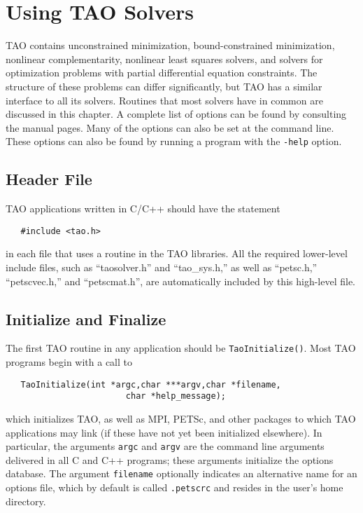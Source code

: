 %
%

\chapter{Using TAO Solvers}
\label{chapter:tao_solver}

TAO contains unconstrained minimization, bound-constrained minimization, 
nonlinear complementarity, nonlinear least squares solvers, and solvers
for optimization problems with partial differential equation constraints.
The structure of these problems can differ significantly, but TAO has a 
similar interface to all its solvers.  
Routines that most solvers have in common are discussed in 
this chapter.
A complete list of options can be found by consulting the manual pages.
Many of the options can also be set at the command line.  These options
can also be found by
running a program with the {\tt -help} option.

\section{Header File}

TAO applications written in C/C++ should have the statement 
\begin{verbatim}
   #include <tao.h>
\end{verbatim}
\noindent
in each file that uses a routine in the TAO libraries.
All the required lower-level include files, such as ``taosolver.h''
and ``tao\_sys.h,'' as well as ``petsc.h,'' ``petscvec.h,'' and
``petscmat.h'',
are automatically included by this high-level file.


\section{Initialize and Finalize}

The first TAO routine in any application should be {\tt TaoInitialize()}.
Most TAO programs begin with a call to
\begin{verbatim}
   TaoInitialize(int *argc,char ***argv,char *filename, 
                        char *help_message);
\end{verbatim}
which initializes TAO, as well as MPI, PETSc, and other packages
to which TAO applications may link (if these have not yet
been initialized elsewhere).  
In particular, the arguments {\tt argc} and 
{\tt argv} are the command line arguments delivered in all C and C++
programs; these arguments initialize the options database.  
 The argument {\tt filename}
optionally indicates an alternative name for an options file, which by
default is called {\tt .petscrc} and resides in the user's home directory.

